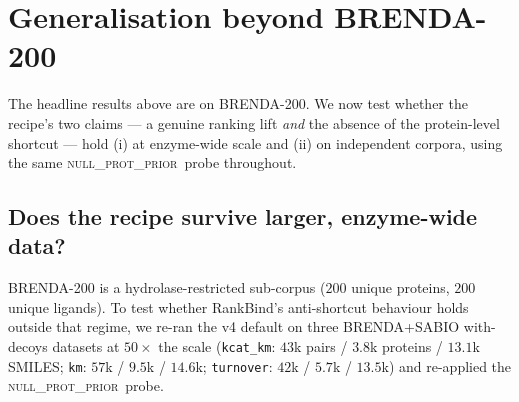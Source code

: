 \documentclass[11pt,a4paper]{article}
\newcommand{\method}{RankBind\xspace}
\newcommand{\nullprior}{\textsc{null\_prot\_prior}\xspace}
\begin{document}
\section{Generalisation beyond BRENDA-200}
\label{sec:generalisation}

The headline results above are on BRENDA-200. We now test whether the recipe's
two claims --- a genuine ranking lift \emph{and} the absence of the
protein-level shortcut --- hold (i) at enzyme-wide scale and (ii) on
independent corpora, using the same \nullprior\ probe throughout.

\subsection{Does the recipe survive larger, enzyme-wide data?}
\label{sec:transfer}

BRENDA-200 is a hydrolase-restricted sub-corpus ($200$ unique proteins,
$200$ unique ligands). To test whether \method's anti-shortcut behaviour
holds outside that regime, we re-ran the v4 default on three
BRENDA+SABIO with-decoys datasets at $50\times$ the scale
(\texttt{kcat\_km}: $43$k pairs / $3.8$k proteins / $13.1$k SMILES;
\texttt{km}: $57$k / $9.5$k / $14.6$k; \texttt{turnover}: $42$k /
$5.7$k / $13.5$k) and re-applied the \nullprior\ probe.
\end{document}

